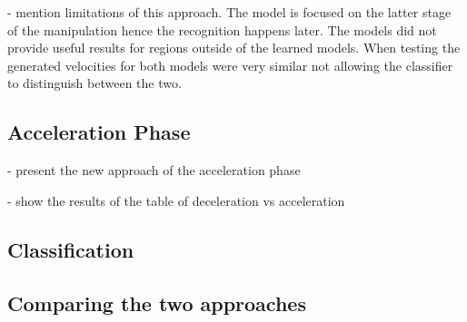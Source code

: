 - mention limitations of this approach. The model is focused on the latter stage of the manipulation hence the recognition happens later. The models did not provide useful results for regions outside of the learned models. When testing the generated velocities for both models were very similar not allowing the classifier to distinguish between the two. 

\subsection{Acceleration Phase}

- present the new approach of the acceleration phase

- show the results of the table of deceleration vs acceleration

\subsection{Classification}

\subsection{Comparing the two approaches}

